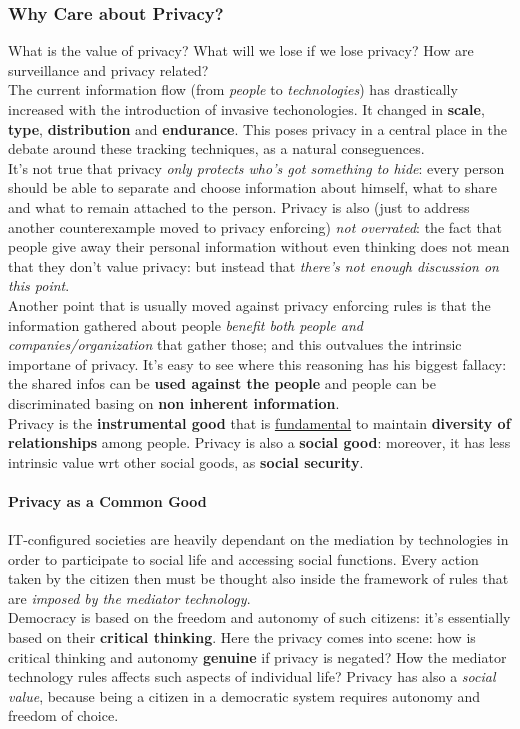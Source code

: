 \documentclass{article}
\begin{document}
			\subsubsection{Why Care about Privacy?}
				What is the value of privacy? What will we lose if we lose privacy? How are surveillance and privacy related?\\
				The current information flow (from \textit{people} to \textit{technologies}) has drastically increased with the introduction of invasive techonologies. It changed in \textbf{scale}, \textbf{type}, \textbf{distribution} and \textbf{endurance}. This poses privacy in a central place in the debate around these tracking techniques, as a natural conseguences.\\
				It's not true that privacy \textit{only protects who's got something to hide}: every person should be able to separate and choose information about himself, what to share and what to remain attached to the person. Privacy is also (just to address another counterexample moved to privacy enforcing) \textit{not overrated}: the fact that people give away their personal information without even thinking does not mean that they don't value privacy: but instead that \textit{there's not enough discussion on this point}.\\
				Another point that is usually moved against privacy enforcing rules is that the information gathered about people \textit{benefit both people and companies/organization} that gather those; and this outvalues the intrinsic importane of privacy. It's easy to see where this reasoning has his biggest fallacy: the shared infos can be \textbf{used against the people} and people can be discriminated basing on \textbf{non inherent information}.\\
				Privacy is the \textbf{instrumental good} that is \underline{fundamental} to maintain \textbf{diversity of relationships} among people. Privacy is also a \textbf{social good}: moreover, it has less intrinsic value wrt other social goods, as \textbf{social security}.

				\paragraph{Privacy as a Common Good}
					IT-configured societies are heavily dependant on the mediation by technologies in order to participate to social life and accessing social functions. Every action taken by the citizen then must be thought also inside the framework of rules that are \textit{imposed by the mediator technology}.\\
					Democracy is based on the freedom and autonomy of such citizens: it's essentially based on their \textbf{critical thinking}. Here the privacy comes into scene: how is critical thinking and autonomy \textbf{genuine} if privacy is negated? How the mediator technology rules affects such aspects of individual life? Privacy has also a \textit{social value}, because being a citizen in a democratic system requires autonomy and freedom of choice.
\end{document}
